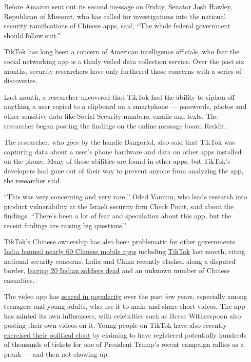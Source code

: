 Before Amazon sent out its second message on Friday, Senator Josh
Hawley, Republican of Missouri, who has called for investigations into
the national security ramifications of Chinese apps, said, ``The whole
federal government should follow suit.''

TikTok has long been a concern of American intelligence officials, who
fear the social networking app is a thinly veiled data collection
service. Over the past six months, security researchers have only
furthered those concerns with a series of discoveries.

Last month, a researcher uncovered that TikTok had the ability to siphon
off anything a user copied to a clipboard on a smartphone --- passwords,
photos and other sensitive data like Social Security numbers, emails and
texts. The researcher began posting the findings on the online message
board Reddit.

The researcher, who goes by the handle Bangorlol, also said that TikTok
was capturing data about a user's phone hardware and data on other apps
installed on the phone. Many of these abilities are found in other apps,
but TikTok's developers had gone out of their way to prevent anyone from
analyzing the app, the researcher said.

``This was very concerning and very rare,'' Oded Vanunu, who leads
research into product vulnerability at the Israeli security firm Check
Point, said about the findings. ``There's been a lot of fear and
speculation about this app, but the recent findings are raising big
questions.''

TikTok's Chinese ownership has also been problematic for other
governments.
\href{https://www.nytimes.com/2020/06/29/world/asia/tik-tok-banned-india-china.html}{India
banned nearly 60 Chinese mobile apps} including
\href{https://www.nytimes.com/2020/06/30/technology/india-china-tiktok.html}{TikTok}
last month, citing national security concerns. India and China recently
clashed along a disputed border,
\href{https://www.nytimes.com/2020/06/16/world/asia/indian-china-border-clash.html}{leaving
20 Indian soldiers dead} and an unknown number of Chinese casualties.

The video app has
\href{https://www.nytimes.com/2019/03/10/style/what-is-tik-tok.html}{soared
in popularity} over the past few years, especially among teenagers and
young adults, who use it to make and share short videos. The app has
minted its own influencers, with celebrities such as Reese Witherspoon
also posting their own videos on it. Young people on TikTok have also
recently
\href{https://www.nytimes.com/2020/06/21/style/tiktok-trump-rally-tulsa.html}{exercised
their political clout} by claiming to have registered potentially
hundreds of thousands of tickets for one of President Trump's recent
campaign rallies as a prank --- and then not showing up.


